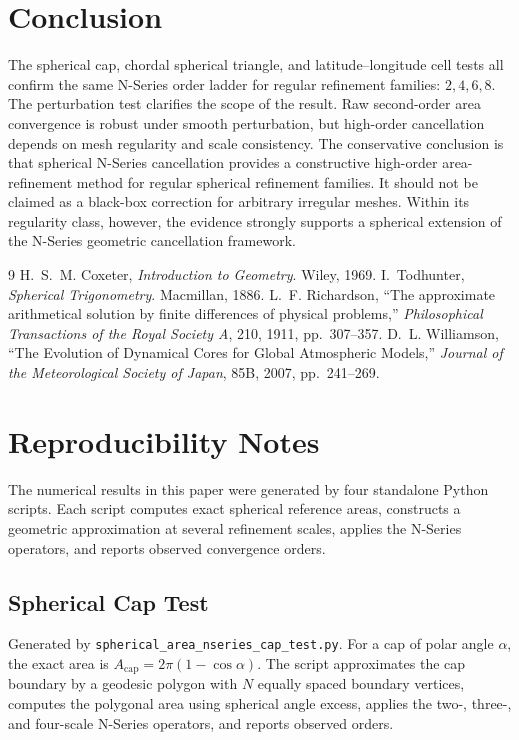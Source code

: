 \documentclass[11pt]{article}
\begin{document}
\section{Conclusion}
The spherical cap, chordal spherical triangle, and latitude--longitude cell tests all
confirm the same N-Series order ladder for regular refinement families: $2,4,6,8$. The
perturbation test clarifies the scope of the result. Raw second-order area convergence is
robust under smooth perturbation, but high-order cancellation depends on mesh regularity and
scale consistency. The conservative conclusion is that spherical N-Series cancellation
provides a constructive high-order area-refinement method for regular spherical refinement
families. It should not be claimed as a black-box correction for arbitrary irregular meshes.
Within its regularity class, however, the evidence strongly supports a spherical extension
of the N-Series geometric cancellation framework.

\begin{thebibliography}{9}
 H.~S.~M. Coxeter, \emph{Introduction to Geometry}. Wiley, 1969.
 I.~Todhunter, \emph{Spherical Trigonometry}. Macmillan, 1886.
 L.~F. Richardson, ``The approximate arithmetical solution by finite
  differences of physical problems,'' \emph{Philosophical Transactions of the Royal Society
  A}, 210, 1911, pp.~307--357.
 D.~L. Williamson, ``The Evolution of Dynamical Cores for Global
  Atmospheric Models,'' \emph{Journal of the Meteorological Society of Japan}, 85B, 2007,
  pp.~241--269.
\end{thebibliography}

\appendix
\section{Reproducibility Notes}
The numerical results in this paper were generated by four standalone Python scripts. Each
script computes exact spherical reference areas, constructs a geometric approximation at
several refinement scales, applies the N-Series operators, and reports observed convergence
orders.

\subsection{Spherical Cap Test}
Generated by \texttt{spherical\_area\_nseries\_cap\_test.py}. For a cap of polar angle
$\alpha$, the exact area is $A_{\mathrm{cap}} = 2\pi(1-\cos\alpha)$. The script approximates
the cap boundary by a geodesic polygon with $N$ equally spaced boundary vertices, computes
the polygonal area using spherical angle excess, applies the two-, three-, and four-scale
N-Series operators, and reports observed orders.
\end{document}
